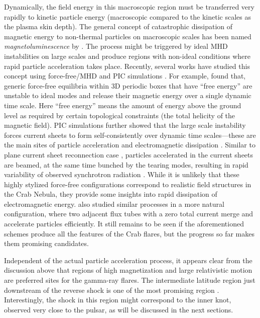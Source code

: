 Dynamically, the field energy in this macroscopic region must be transferred very rapidly to kinetic particle energy (macroscopic compared to the kinetic scales as the plasma skin depth). The general concept of catastrophic dissipation of magnetic energy to non-thermal particles on macroscopic scales has been named \textit{magnetoluminescence} by \citet{Blandford_2014}. The process might be triggered by ideal MHD instabilities on large scales and produce regions with non-ideal conditions where rapid particle acceleration takes place. Recently, several works have studied this concept using force-free/MHD \citep{East_2015,2016arXiv160305731L,Zrake_2016} and PIC simulations \citep{2016arXiv160305731L,Nalewajko_2016,Yuan_2016}. For example, \citet{East_2015} found that, generic force-free equilibria within 3D periodic boxes that have ``free energy'' are unstable to ideal modes and release their magnetic energy over a single dynamic time scale. Here ``free energy'' means the amount of energy above the ground level as required by certain topological constraints (the total helicity of the magnetic field). PIC simulations further showed that the large scale instability forces current sheets to form self-consistently over dynamic time scales---these are the main sites of particle acceleration and electromagnetic dissipation \citep{2016arXiv160305731L,Nalewajko_2016,Yuan_2016}. Similar to plane current sheet reconnection case \citep[e.g.][]{Cerutti_2013,Cerutti_2014}, particles accelerated in the current sheets are beamed, at the same time bunched by the tearing modes, resulting in rapid variability of observed synchrotron radiation \citep{Yuan_2016}. While it is unlikely that these highly stylized force-free configurations correspond to realistic field structures in the Crab Nebula, they provide some insights into rapid dissipation of electromagnetic energy. \citet{2016arXiv160305731L} also studied similar processes in a more natural configuration, where two adjacent flux tubes with a zero total current merge and accelerate particles efficiently. It still remains to be seen if the aforementioned schemes produce all the features of the Crab flares, but the progress so far makes them promising candidates.

Independent of the actual particle acceleration process, it appears clear from the discussion above that regions of high magnetization and large relativistic motion are preferred sites for the gamma-ray flares. The intermediate latitude region just downstream of the reverse shock is one of the most promising region \citet{2016arXiv160305731L}. Interestingly, the shock in this region might correspond to the inner knot, observed very close to the pulsar, as will be discussed in the next sections. 